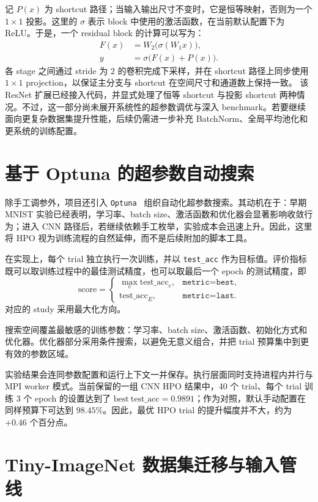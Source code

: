 \documentclass[a4paper,11pt,oneside]{article}
\begin{document}
记 $P(x)$ 为 shortcut 路径；当输入输出尺寸不变时，它是恒等映射，否则为一个 $1\times1$ 投影。这里的 $\sigma$ 表示 block 中使用的激活函数，在当前默认配置下为 ReLU。于是，一个 residual block 的计算可以写为：
\[
\begin{aligned}
F(x) &= W_2\bigl(\sigma(W_1x)\bigr),\\
y &= \sigma\bigl(F(x)+P(x)\bigr).
\end{aligned}
\]
各 stage 之间通过 stride 为 $2$ 的卷积完成下采样，并在 shortcut 路径上同步使用 $1\times1$ projection，以保证主分支与 shortcut 在空间尺寸和通道数上保持一致。
该 ResNet 扩展已经接入代码，并显式处理了恒等 shortcut 与投影 shortcut 两种情况。不过，这一部分尚未展开系统性的超参数调优与深入 benchmark。若要继续面向更复杂数据集提升性能，后续仍需进一步补充 BatchNorm、全局平均池化和更系统的训练配置。

\FloatBarrier
\section{基于 Optuna 的超参数自动搜索}

除手工调参外，项目还引入 \texttt{Optuna}~\cite{akiba2019optuna} 组织自动化超参数搜索。其动机在于：早期 MNIST 实验已经表明，学习率、batch size、激活函数和优化器会显著影响收敛行为；进入 CNN 路径后，若继续依赖手工枚举，实验成本会迅速上升。因此，这里将 HPO 视为训练流程的自然延伸，而不是后续附加的脚本工具。

在实现上，每个 trial 独立执行一次训练，并以 \texttt{test\_acc} 作为目标值。评价指标既可以取训练过程中的最佳测试精度，也可以取最后一个 epoch 的测试精度，即
\[
\mathrm{score}=
\begin{cases}
\max_e \mathrm{test\_acc}_e, & \texttt{metric=best},\\
\mathrm{test\_acc}_E, & \texttt{metric=last}.
\end{cases}
\]
对应的 study 采用最大化方向。

搜索空间覆盖最敏感的训练参数：学习率、batch size、激活函数、初始化方式和优化器。优化器部分采用条件搜索，以避免无意义组合，并把 trial 预算集中到更有效的参数区域。

实验结果会连同参数配置和运行上下文一并保存。执行层面同时支持进程内并行与 MPI worker 模式。当前保留的一组 CNN HPO 结果中，40 个 trial、每个 trial 训练 3 个 epoch 的设置达到了 \(\mathrm{best\ test\_acc}=0.9891\)；作为对照，默认手动配置在同样预算下可达到 \(98.45\%\)。因此，最优 HPO trial 的提升幅度并不大，约为 \(+0.46\) 个百分点。

\section{Tiny-ImageNet 数据集迁移与输入管线}
\end{document}
